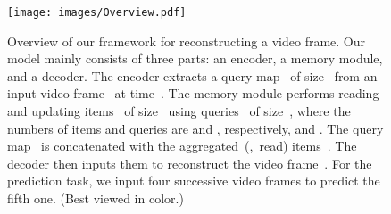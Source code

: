 \documentclass[10pt,twocolumn,letterpaper]{article}
\begin{document}
	\begin{figure}[t]
		\centering
		\texttt{[image: images/Overview.pdf]}
\vspace{-0.2cm}
		\caption{Overview of our framework for reconstructing a video frame. Our model mainly consists of three parts: an encoder, a memory module, and a decoder. The encoder extracts a query map~ of size~ from an input video frame~ at time~. The memory module performs reading and updating items~ of size~ using queries~ of size~, where the numbers of items and queries are  and , respectively, and . The query map~ is concatenated with the aggregated~(\ie,~read) items~. The decoder then inputs them to reconstruct the video frame~. For the prediction task, we input four successive video frames to predict the fifth one. (Best viewed in color.)}
		\label{fig:overview}
\vspace{-0.3cm}
    \end{figure}
\end{document}
